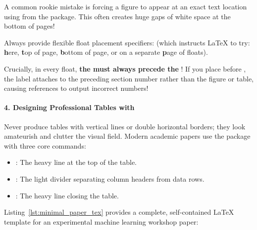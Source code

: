 \begin{warning}
A common rookie mistake is forcing a figure to appear at an exact text location using \code{[H]} from the  package. This often creates huge gaps of white space at the bottom of pages!

Always provide flexible float placement specifiers: \code{[htbp]} (which instructs \LaTeX{} to try: \textbf{h}ere, \textbf{t}op of page, \textbf{b}ottom of page, or on a separate \textbf{p}age of floats).

Crucially, in every float, \textbf{the \code{\\caption} must always precede the \code{\\label}}! If you place \code{\\label} before \code{\\caption}, the label attaches to the preceding section number rather than the figure or table, causing references to output incorrect numbers!
\end{warning}

\paragraph{4. Designing Professional Tables with }
Never produce tables with vertical lines or double horizontal borders; they look amateurish and clutter the visual field. Modern academic papers use the  package with three core commands:
\begin{itemize}
    \item \code{\\toprule}: The heavy line at the top of the table.
    \item \code{\\midrule}: The light divider separating column headers from data rows.
    \item \code{\\bottomrule}: The heavy line closing the table.
\end{itemize}

Listing~\ref{lst:minimal_paper_tex} provides a complete, self-contained \LaTeX{} template for an experimental machine learning workshop paper:


